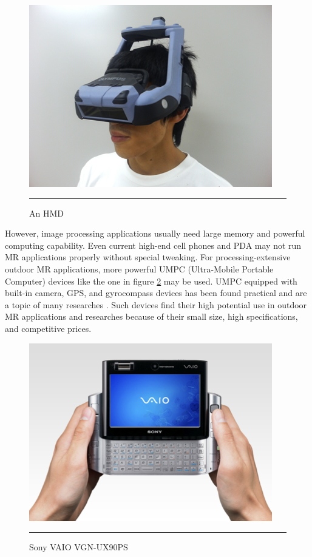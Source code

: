 \begin{figure}[htbp]
	\centering
	\includegraphics{./Primitives/hmd.jpg}
	\rule{35em}{0.5pt}
	\caption[An HMD]{An HMD}
	\label{fig:HMD}
\end{figure}

However, image processing applications usually need large memory and powerful computing capability. Even current high-end cell phones and PDA may not run MR applications properly without special tweaking. For processing-extensive outdoor MR applications, more powerful UMPC (Ultra-Mobile Portable Computer) devices like the one in figure \ref{fig:VAIO} may be used. UMPC equipped with built-in camera, GPS, and gyrocompass devices has been found practical and are a topic of many researches \citep{Reference2} \citep{Reference4}. Such devices find their high potential use in outdoor MR applications and researches because of their small size, high specifications, and competitive prices.

\begin{figure}[htbp]
	\centering
	\includegraphics{./Primitives/vaio.png}
	\rule{35em}{0.5pt}
	\caption[Sony VAIO VGN-UX90PS]{Sony VAIO VGN-UX90PS}
	\label{fig:VAIO}
\end{figure}

